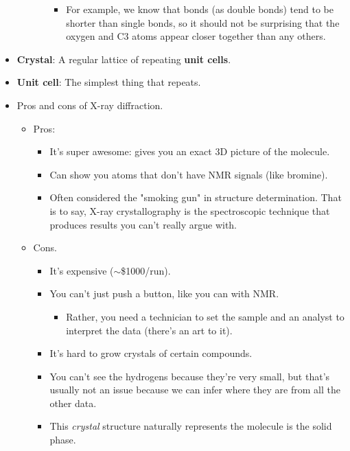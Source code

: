 \documentclass[../notes.tex]{subfiles}
\begin{document}
\begin{itemize}
\begin{itemize}
\begin{itemize}
            \begin{itemize}
                \item For example, we know that  bonds (as double bonds) tend to be shorter than single bonds, so it should not be surprising that the oxygen and C3 atoms appear closer together than any others.
            \end{itemize}
        \end{itemize}
    \end{itemize}
    \item \textbf{Crystal}: A regular lattice of repeating \textbf{unit cells}.
    \item \textbf{Unit cell}: The simplest thing that repeats.
    \item Pros and cons of X-ray diffraction.
    \begin{itemize}
        \item Pros:
        \begin{itemize}
            \item It's super awesome: gives you an exact 3D picture of the molecule.
            \item Can show you atoms that don't have NMR signals (like bromine).
            \item Often considered the "smoking gun" in structure determination. That is to say, X-ray crystallography is the spectroscopic technique that produces results you can't really argue with.
        \end{itemize}
        \item Cons.
        \begin{itemize}
            \item It's expensive ($\sim$\$1000/run).
            \item You can't just push a button, like you can with NMR.
            \begin{itemize}
                \item Rather, you need a technician to set the sample and an analyst to interpret the data (there's an art to it).
            \end{itemize}
            \item It's hard to grow crystals of certain compounds.
            \item You can't see the hydrogens because they're very small, but that's usually not an issue because we can infer where they are from all the other data.
            \item This \emph{crystal} structure naturally represents the molecule is the solid phase.

\end{itemize}
\end{itemize}
\end{itemize}
\end{document}
